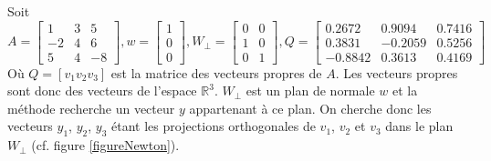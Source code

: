 Soit $A=  \left[ 
\begin{matrix}
1 & 3 & 5 \\
-2 & 4 & 6 \\
5 & 4 & -8
\end{matrix} \right] 
, w = 
\left[ 
\begin{matrix}
1 \\
0\\
0
\end{matrix} \right] , 
W_{\bot} = 
\left[ 
\begin{matrix}
0 & 0 \\
1 & 0 \\
0 & 1 
\end{matrix} \right] , 
Q=
\left[ 
\begin{matrix}
0.2672 & 0.9094 & 0.7416 \\
0.3831 & -0.2059 & 0.5256 \\
-0.8842 & 0.3613 & 0.4169
\end{matrix} \right] 
$\\
Où $Q=[v_1 v_2 v_3]$ est la matrice des vecteurs propres de $A$. Les vecteurs propres sont donc des vecteurs de l'espace $\mathbb{R}^3$. $W_{\bot}$ est un plan de normale $w$ et la méthode recherche un vecteur $y$ appartenant à ce plan. On cherche donc les vecteurs $y_1$, $y_2$, $y_3$ étant les projections orthogonales de $v_1$, $v_2$ et $v_3$ dans le plan $W_{\bot}$ (cf. figure \ref{figureNewton}).

